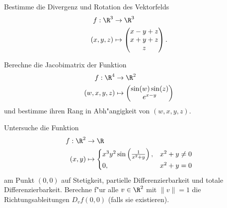 \vspace{0.3cm}

\begin{prob}
Bestimme die Divergenz und Rotation des Vektorfelds 
    \begin{equation*}
        \begin{split}
            f:\R^3&\to\R^3\\
            (x,y,z)&\mapsto 
            \begin{pmatrix}
            x-y+z\\
            x+y+z\\
            z
            \end{pmatrix}.
        \end{split}
    \end{equation*}
\end{prob}

\vspace{0.3cm}

\begin{prob}
Berechne die Jacobimatrix der Funktion 
    \begin{equation*}
        \begin{split}
            f:\R^4&\to\R^2\\
            (w,x,y,z)&\mapsto 
            \begin{pmatrix}
            \sin(w)\sin(z)\\
            e^{x-y}
            \end{pmatrix}
        \end{split}
    \end{equation*}
    und bestimme ihren Rang in Abh"angigkeit von $(w,x,y,z)$.
\end{prob}


\vspace{0.3cm}

\begin{prob}
Untersuche die Funktion 
\begin{equation*}
        \begin{split}
            f:\R^2&\to\R\\
            (x,y)&\mapsto \begin{cases}
						x^3y^2\sin\left(\frac{1}{x^2+y}\right),& x^2+y\neq 0\\
						0,& x^2+y=0
						\end{cases}
        \end{split}
    \end{equation*}
 am Punkt $(0,0)$ auf Stetigkeit, partielle Differenzierbarkeit und totale Differenzierbarkeit. Berechne f"ur alle $v\in\R^2$ mit $\|v\|=1$ die Richtungsableitungen $D_vf(0,0)$ (falls sie existieren).
\end{prob}

